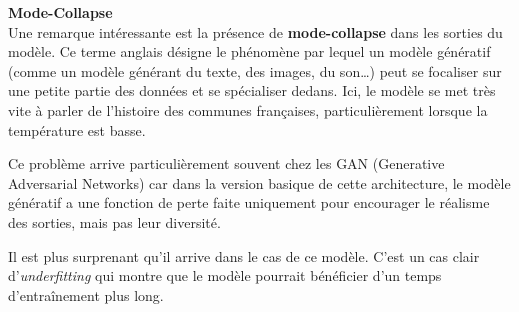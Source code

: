 \textbf{Mode-Collapse} \\

Une remarque intéressante est la présence de \textbf{mode-collapse} dans
les sorties du modèle. Ce terme anglais désigne le phénomène par lequel
un modèle génératif (comme un modèle générant du texte, des images, du
son\ldots{}) peut se focaliser sur une petite partie des données et se
spécialiser dedans. Ici, le modèle se met très vite à parler de
l'histoire des communes françaises, particulièrement lorsque la
température est basse.

Ce problème arrive particulièrement souvent chez les GAN (Generative
Adversarial Networks) car dans la version basique de cette architecture,
le modèle génératif a une fonction de perte faite uniquement pour
encourager le réalisme des sorties, mais pas leur diversité.

Il est plus surprenant qu'il arrive dans le cas de ce modèle. C'est un
cas clair d'\emph{underfitting} qui montre que le modèle pourrait
bénéficier d'un temps d'entraînement plus long.







